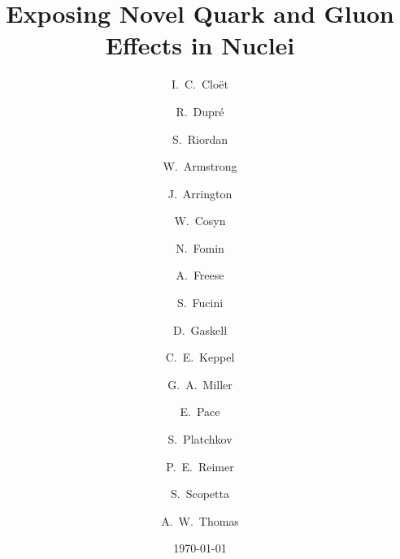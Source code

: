 \documentclass[10pt,linenumbers]{iopart}
\date{\today}
\begin{document}
\title{Exposing Novel Quark and Gluon Effects in Nuclei}

\author{I.~C.~Clo\"et}
\address{Physics Division, Argonne National Laboratory, Lemont, IL 60439, USA}

\author{R.~Dupr\'{e}}
\address{Institut de Physique Nucl\'eaire, CNRS-IN2P3, Univ. Paris-Sud, Universit\'e Paris-Saclay, 91406 Orsay Cedex, France}

\author{S.~Riordan}
\address{Physics Division, Argonne National Laboratory, Lemont, IL 60439, USA}

\author{W.~Armstrong}
\address{Physics Division, Argonne National Laboratory, Lemont, IL 60439, USA}

\author{J.~Arrington}
\address{Physics Division, Argonne National Laboratory, Lemont, IL 60439, USA}

\author{W.~Cosyn}
\address{Department of Physics and Astronomy, Ghent University, Proeftuinstraat 86, B9000 Ghent, Belgium}

\author{N.~Fomin}
\address{University of Tennessee, Knoxville, TN 37996, USA}

\author{A.~Freese}
\address{Physics Division, Argonne National Laboratory, Lemont, IL 60439, USA}

\author{S.~Fucini}
\address{Perugia University and INFN, Perugia Section, via A. Pascoli snc I-06123 Perugia, Italy}

\author{D.~Gaskell}
\address{Thomas Jefferson National Accelerator Facility, Newport News, VA 23606, USA}

\author{C.~E.~Keppel}
\address{Thomas Jefferson National Accelerator Facility, Newport News, VA 23606, USA}

\author{G.~A.~Miller}
\address{Department of Physics, University of Washington, Seattle, WA 98195-1560}

\author{E.~Pace}
\address{Universit\`a di Roma ``Tor Vergata'' and INFN, Sezione di  Roma Tor Vergata, 00133 Rome, Italy}

\author{S.~Platchkov}
\address{IRFU, CEA, Université Paris-Saclay, 91191 Gif-sur-Yvette, France}

\author{P.~E.~Reimer}
\address{Physics Division, Argonne National Laboratory, Lemont, IL 60439, USA}

\author{S.~Scopetta}
\address{Università di Perugia and INFN, Sezione di Perugia, via A. Pascoli snc I-06123 Perugia, Italy}

\author{A.~W.~Thomas}
\address{ARC Centre of Excellence for Particle Physics at the Terascale and CSSM, Department of Physics,
University of Adelaide, Adelaide SA 5005, Australia}
\end{document}
